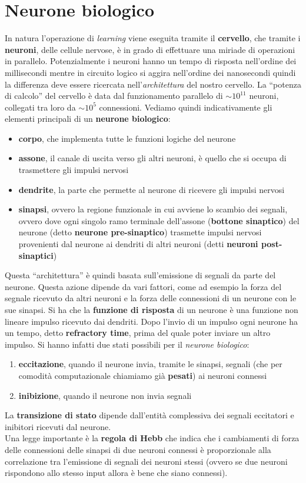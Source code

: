 \documentclass[a4paper,12pt, oneside]{book}
\begin{document}
\section{Neurone biologico}
In natura l'operazione di \textit{learning} viene eseguita tramite il
\textbf{cervello}, che tramite i \textbf{neuroni}, delle cellule nervose, è in
grado di effettuare una miriade di operazioni in parallelo. Potenzialmente i
neuroni hanno un tempo di risposta nell'ordine dei millisecondi mentre in
circuito logico si aggira nell'ordine dei nanosecondi quindi la differenza deve
essere ricercata nell'\textit{architettura} del nostro cervello. La ``potenza di
calcolo'' del cervello è data dal funzionamento parallelo di $\sim 10^{11}$
neuroni, collegati tra loro da $\sim 10^5$ connessioni. Vediamo quindi
indicativamente gli elementi principali di un \textbf{neurone biologico}:
\begin{itemize}
  \item \textbf{corpo}, che implementa tutte le funzioni logiche del neurone
  \item \textbf{assone}, il canale di uscita verso gli altri neuroni, è quello
  che si occupa di trasmettere gli impulsi nervosi
  \item \textbf{dendrite}, la parte che permette al neurone di ricevere gli
  impulsi nervosi
  \item \textbf{sinapsi}, ovvero la regione funzionale in cui avviene lo scambio
  dei segnali, ovvero dove ogni singolo ramo terminale dell'assone
  (\textbf{bottone sinaptico}) del neurone (detto \textbf{neurone
    pre-sinaptico}) trasmette impulsi nervosi provenienti dal neurone ai
  dendriti di altri neuroni (detti \textbf{neuroni post-sinaptici})
\end{itemize}
Questa ``architettura'' è quindi basata sull'emissione di segnali da parte del
neurone. Questa azione dipende da vari fattori, come ad esempio la forza del
segnale ricevuto da altri neuroni e la forza delle connessioni di un neurone con
le sue sinapsi. Si ha che la \textbf{funzione di risposta} di un neurone è una
funzione non lineare impulso ricevuto dai dendriti. Dopo l'invio di un impulso
ogni neurone ha un tempo, detto \textbf{refractory time}, prima del quale poter
inviare un altro impulso. Si hanno infatti due stati possibili per il
\textit{neurone biologico}:
\begin{enumerate}
  \item \textbf{eccitazione}, quando il neurone invia, tramite le sinapsi,
  segnali (che per comodità computazionale chiamiamo già \textbf{pesati}) ai
  neuroni connessi
  \item \textbf{inibizione}, quando il neurone non invia segnali
\end{enumerate}
La \textbf{transizione di stato} dipende dall'entità complessiva dei segnali
eccitatori e inibitori ricevuti dal neurone.\\
Una legge importante è la \textbf{regola di Hebb} che indica che i cambiamenti
di forza delle connessioni delle sinapsi di due neuroni connessi è proporzionale
alla correlazione tra l'emissione di segnali dei neuroni stessi (ovvero se due
neuroni rispondono allo stesso input allora è bene che siano connessi).
\end{document}
